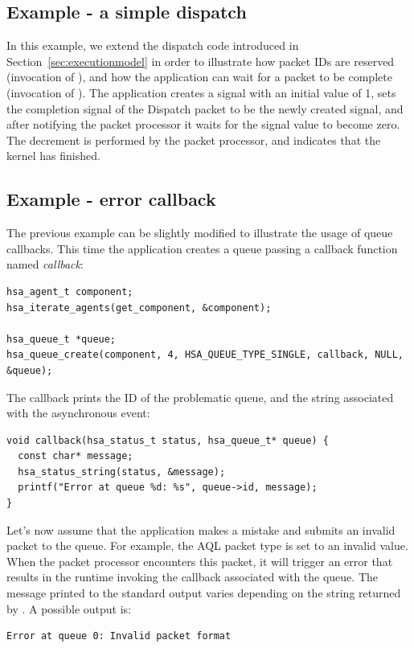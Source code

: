 \documentclass[final,oneside]{book}
\begin{document}
\subsection{Example - a simple dispatch}
In this example, we extend the dispatch code introduced in
Section~\ref{sec:executionmodel} in order to illustrate how packet IDs are
reserved (invocation of ), and how the
application can wait for a packet to be complete (invocation of
). The application creates a signal with an
initial value of 1, sets the completion signal of the Dispatch packet to be the
newly created signal, and after notifying the packet processor it
waits for the signal value to become zero. The decrement is performed by the
packet processor, and indicates that the kernel has finished.



\subsection{Example - error callback}
The previous example can be slightly modified to illustrate the usage of queue
callbacks. This time the application creates a queue passing a callback function
named \emph{callback}:
\begin{lstlisting}
hsa_agent_t component;
hsa_iterate_agents(get_component, &component);

hsa_queue_t *queue;
hsa_queue_create(component, 4, HSA_QUEUE_TYPE_SINGLE, callback, NULL, &queue);
\end{lstlisting}

The callback prints the ID of the problematic queue, and the string associated
with the asynchronous event:
\begin{lstlisting}
void callback(hsa_status_t status, hsa_queue_t* queue) {
  const char* message;
  hsa_status_string(status, &message);
  printf("Error at queue %d: %s", queue->id, message);
}
\end{lstlisting}
Let's now assume that the application makes a mistake and submits an invalid
packet to the queue. For example, the AQL packet type is set to an invalid
value. When the packet processor encounters this packet, it will trigger an
error that results in the runtime invoking the callback associated with the
queue. The message printed to the standard output varies depending on the string
returned by . A possible output is:
\begin{lstlisting}
Error at queue 0: Invalid packet format
\end{lstlisting}
\end{document}
